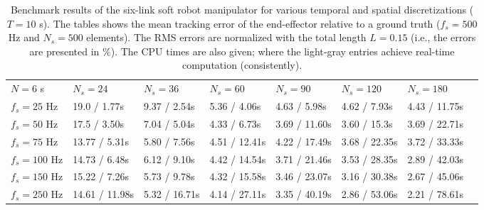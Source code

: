 \begin{sidewaystable}[!t]
\caption{Benchmark results of the six-link soft robot manipulator for various temporal and spatial discretizations ($T =10$ s). The tables shows the mean tracking error of the end-effector relative to a ground truth ($f_s = 500$ Hz and $N_s = 500$ elements). The RMS errors are normalized with the total length $L = 0.15$ (i.e., the errors are presented in $\%$). The CPU times are also given; where the light-gray entries achieve real-time computation (consistently).  \label{tab:benchmark_table}}
\centering

\begin{tabular}{l|lllllll}
$N = 6$ s  & $N_s = 24$ & $N_s =36$ &  $N_s =60$ &  $N_s = 90$ & $N_s = 120$ & $N_s =180$ \\[0.15em]
$f_s = 25$ Hz &  \textcolor{deepcolor}{\small{19.0 / 1.77s }} &  \textcolor{deepcolor}{\small{9.37 / 2.54s }} & \textcolor{deepcolor}{\small{5.36 / 4.06s }} &  \textcolor{deepcolor}{\small{4.63 / 5.98s }} &  \textcolor{deepcolor}{\small{4.62 / 7.93s}} & \small{4.43 / 11.75s } \\ [0.5em]
$f_s = 50$ Hz &  \textcolor{deepcolor}{\small{17.5 / 3.50s }} &  \textcolor{deepcolor}{\small{7.04 / 5.04s }} &  \textcolor{deepcolor}{\small{4.33 / 6.73s}} & \small{3.69 / 11.60s } & \small{3.60 / 15.3s} & \small{3.69 / 22.71s } \\ [0.5em]
$f_s = 75$ Hz &  \textcolor{deepcolor}{\small{13.77 / 5.31s}} &  \textcolor{deepcolor}{\small{5.80 / 7.56s}} & \small{4.51 / 12.41s} & \small{4.22 / 17.49s} & \small{3.68 / 22.35s} & \small{3.72 / 33.33s} \\ [0.5em]
$f_s = 100$ Hz &  \textcolor{deepcolor}{\small{14.73 / 6.48s}} &  \textcolor{deepcolor}{\small{6.12 / 9.10s}} & \small{4.42 / 14.54s} & \small{3.71 / 21.46s} & \small{3.53 / 28.35s} & \small{2.89 / 42.03s} \\ [0.5em]
$f_s = 150$ Hz &  \textcolor{deepcolor}{\small{15.22 / 7.26s}} &  \textcolor{deepcolor}{\small{5.73 / 9.78s}} & \small{4.32 / 15.58s} & \small{3.46 / 23.07s} & \small{3.16 / 30.38s } & \small{2.67 / 45.06s } \\ [0.5em]
$f_s = 250$ Hz & {\small{14.61 / 11.98s}} & \small{5.32 / 16.71s} & \small{4.14 / 27.11s} & \small{3.35 / 40.19s} & \small{2.86 / 53.06s } & \small{2.21 / 78.61s } \\[0.5em]
\end{tabular}
\end{sidewaystable}

